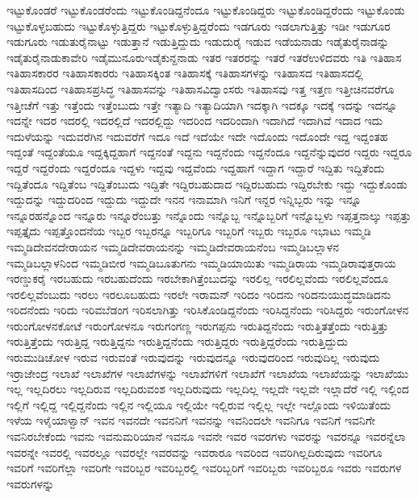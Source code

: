 {ಇಟ್ಟುಕೊಂಡರೆ
ಇಟ್ಟುಕೊಂಡರೆಂದು
ಇಟ್ಟುಕೊಂಡಿದ್ದನೆಂದೂ
ಇಟ್ಟುಕೊಂಡಿದ್ದರು
ಇಟ್ಟುಕೊಂಡಿದ್ದರೆಂದು
ಇಟ್ಟುಕೊಂಡು
ಇಟ್ಟುಕೊಳ್ಳಬಹುದು
ಇಟ್ಟುಕೊಳ್ಳುತ್ತಿದ್ದರು
ಇಟ್ಟುಕೊಳ್ಳುತ್ತಿದ್ದರೆಂದು
ಇಡಗೂರು
ಇಡಲಾಗುತ್ತಿತ್ತು
ಇಡೀ
ಇಡುಗೂರ
ಇಡುಗೂರು
ಇಡುತುರೈನಾಟ್ಟು
ಇಡುತ್ತಾನೆ
ಇಡುತ್ತಿದ್ದುದು
ಇಡುದುರೈ
ಇಡುವ
ಇಡೆಯನಾಡು
ಇಡೈತುರೈನಾಡನ್ನು
ಇಡೈತುರೈನಾಡುಕಾವೇರಿ
ಇಡೈಮುನೂರುಇಡೈಕುನ್ದನಾಡು
ಇತರ
ಇತರರನ್ನು
ಇತರೆ
ಇತರೆಉಳಿದವರು
ಇತಿ
ಇತಿಹಾಸ
ಇತಿಹಾಸಕಾರರ
ಇತಿಹಾಸಕಾರರು
ಇತಿಹಾಸಕ್ಕಿಂತ
ಇತಿಹಾಸಕ್ಕೆ
ಇತಿಹಾಸಗಳನ್ನು
ಇತಿಹಾಸದ
ಇತಿಹಾಸದಲ್ಲಿ
ಇತಿಹಾಸದಿಂದ
ಇತಿಹಾಸಪ್ರಸಿದ್ಧ
ಇತಿಹಾಸವನ್ನು
ಇತಿಹಾಸವಿದ್ವಾಂಸರು
ಇತಿಹಾಸವು
ಇತ್ತ
ಇತ್ತಣ
ಇತ್ತೀಚಿನವರೆಗೂ
ಇತ್ತೀಚೆಗೆ
ಇತ್ತು
ಇತ್ತೆಂದು
ಇತ್ತೆಂಬುದು
ಇತ್ತೇ
ಇತ್ಯಾದಿ
ಇತ್ಯಾದಿಯಾಗಿ
ಇದಕ್ಕಾಗಿ
ಇದಕ್ಕೂ
ಇದಕ್ಕೆ
ಇದನ್ನು
ಇದನ್ನೂ
ಇದನ್ನೇ
ಇದರ
ಇದರಲ್ಲಿ
ಇದರಲ್ಲಿದೆ
ಇದರಲ್ಲಿದ್ದು
ಇದರಿಂದ
ಇದರಿಂದಾಗಿ
ಇದಾಗಿದೆ
ಇದಾಗಿವೆ
ಇದಾದ
ಇದು
ಇದುಳೆಯನ್ನು
ಇದುವರೆಗಿನ
ಇದುವರೆಗೆ
ಇದೂ
ಇದೆ
ಇದೆಯೇ
ಇದೇ
ಇದೊಂದು
ಇದೊಂದೇ
ಇದ್ದ
ಇದ್ದಂತಹ
ಇದ್ದಂತೆ
ಇದ್ದಂತೆಯೂ
ಇದ್ದಕ್ಕಿದ್ದಹಾಗೆ
ಇದ್ದನಂತೆ
ಇದ್ದನು
ಇದ್ದನೆಂದು
ಇದ್ದನೆಂದೂ
ಇದ್ದನೆನ್ನುವುದರ
ಇದ್ದರು
ಇದ್ದರೂ
ಇದ್ದರೆ
ಇದ್ದರೆಂದು
ಇದ್ದರೆಂದೂ
ಇದ್ದಳು
ಇದ್ದವು
ಇದ್ದವೆಂದು
ಇದ್ದಹಾಗೆ
ಇದ್ದಾಗ
ಇದ್ದಾರೆ
ಇದ್ದಿತು
ಇದ್ದಿತೆಂದು
ಇದ್ದಿತೆಂದೂ
ಇದ್ದಿತೆಂಬ
ಇದ್ದಿತೆಂಬುದು
ಇದ್ದಿತೇ
ಇದ್ದಿರಬಹುದಾದ
ಇದ್ದಿರಬಹುದು
ಇದ್ದಿರಬೇಕು
ಇದ್ದು
ಇದ್ದುಕೊಂಡು
ಇದ್ದುದನ್ನು
ಇದ್ದುದರಿಂದ
ಇದ್ದುದು
ಇದ್ದುದೇ
ಇನನ
ಇನಾಮಾಗಿ
ಇನಿಗೆ
ಇನ್ದರ
ಇನ್ನಿಬ್ಬರು
ಇನ್ನು
ಇನ್ನೂ
ಇನ್ನೂರಹನ್ನೊಂದ
ಇನ್ನೂರು
ಇನ್ನೂರೆಂಬತ್ತು
ಇನ್ನೊಂದು
ಇನ್ನೊಬ್ಬ
ಇನ್ನೊಬ್ಬರಿಗೆ
ಇನ್ನೊಬ್ಬಳು
ಇಪ್ಪತ್ತನಾಲ್ಕು
ಇಪ್ಪತ್ತು
ಇಪ್ಪತ್ತೈದು
ಇಪ್ಪತ್ತೊಂದನೆಯ
ಇಬ್ಬರ
ಇಬ್ಬರನ್ನೂ
ಇಬ್ಬರಿಗೂ
ಇಬ್ಬರಿಗೆ
ಇಬ್ಬರು
ಇಬ್ಬರೂ
ಇಭಾಟು
ಇಮ್ಮಡಿ
ಇಮ್ಮಡಿದೇವನದೇರಾಯನ
ಇಮ್ಮಡಿದೇವರಾಯನನ್ನು
ಇಮ್ಮಡಿದೇವರಾಯನೆಂಬ
ಇಮ್ಮಡಿಬಲ್ಲಾಳನ
ಇಮ್ಮಡಿಬಲ್ಲಾಳನಿಂದ
ಇಮ್ಮಡಿಬೀರ
ಇಮ್ಮಡಿಬೂತುಗನು
ಇಮ್ಮಡಿಯಾಯಿತು
ಇಮ್ಮಡಿರಾಯ
ಇಮ್ಮಡಿರಾವುತ್ತರಾಯ
ಇರಣ್ಡುಕರೈ
ಇರಬಹುದು
ಇರಬಹುದೆಂದು
ಇರಬೇಕಾಗಿತ್ತೆಂಬುದನ್ನು
ಇರಲಿಲ್ಲ
ಇರಲಿಲ್ಲವೆಂದು
ಇರಲಿಲ್ಲವೆಂದೂ
ಇರಲಿಲ್ಲವೆಂಬುದು
ಇರಲು
ಇರಲೂಬಹುದು
ಇರಲೇ
ಇರಾಮನ್
ಇರಿದಂ
ಇರಿದನು
ಇರಿದನುಯುದ್ಧಮಾಡಿದನು
ಇರಿದನೆಂದು
ಇರಿದು
ಇರಿವಬೆಡಂಗ
ಇರಿಸಲಾಗಿತ್ತು
ಇರಿಸಿಕೊಂಡಿದ್ದನೆಂದು
ಇರಿಸಿದ್ದನೆಂದು
ಇರಿಸಿದ್ದರು
ಇರುಂಗೋಳನ
ಇರುಂಗೋಳನಕೋಟೆ
ಇರುಂಗೋಳನೂ
ಇರುಗಂಗಣ್ಣ
ಇರುಗಪ್ಪನು
ಇರುತಿದ್ದನೆಂದು
ಇರುತ್ತಿತತ್ತೆಂದು
ಇರುತ್ತಿತ್ತು
ಇರುತ್ತಿತ್ತೆಂದು
ಇರುತ್ತಿದ್ದ
ಇರುತ್ತಿದ್ದನು
ಇರುತ್ತಿದ್ದನೆಂದು
ಇರುತ್ತಿದ್ದರು
ಇರುತ್ತಿದ್ದರೆಂದು
ಇರುತ್ತಿದ್ದುದು
ಇರುಮುಡಿಚೋಳ
ಇರುವ
ಇರುವಂತೆ
ಇರುವುದನ್ನು
ಇರುವುದನ್ನೂ
ಇರುವುದರಿಂದ
ಇರುವುದಿಲ್ಲ
ಇರುವುದು
ಇರ್ರಾಜೇಂದ್ರ
ಇಲಾಖೆ
ಇಲಾಖೆಗಳ
ಇಲಾಖೆಗಳನ್ನು
ಇಲಾಖೆಗಳಿಗೆ
ಇಲಾಖೆಗೆ
ಇಲಾಖೆಯ
ಇಲಾಖೆಯನ್ನು
ಇಲಾಖೆಯು
ಇಲ್ಲ
ಇಲ್ಲದಿರಲು
ಇಲ್ಲದಿರುವ
ಇಲ್ಲದಿರುವಂಶ
ಇಲ್ಲದಿರುವುದು
ಇಲ್ಲದಿಲ್ಲ
ಇಲ್ಲದೇ
ಇಲ್ಲವೇ
ಇಲ್ಲಾದೆರೆ
ಇಲ್ಲಿ
ಇಲ್ಲಿಂದ
ಇಲ್ಲಿಗೆ
ಇಲ್ಲಿದ್ದ
ಇಲ್ಲಿದ್ದನೆಂದು
ಇಲ್ಲಿನ
ಇಲ್ಲಿಯೂ
ಇಲ್ಲಿಯೇ
ಇಲ್ಲಿರುವ
ಇಲ್ಲಿಲ್ಲ
ಇಲ್ಲೇ
ಇಲ್ಲೊಂದು
ಇಳಿಯಿತೆಂದು
ಇಳೆಯ
ಇಳೈಯಾಳ್ವಾನ್
ಇವನ
ಇವನದೇ
ಇವನನಿಗೆ
ಇವನನ್ನು
ಇವನಿಂದಲೇ
ಇವನಿಗೂ
ಇವನಿಗೆ
ಇವನಿಗೇ
ಇವನಿರಬೇಕೆಂದು
ಇವನು
ಇವನುಮರಿಯಾನೆ
ಇವನೂ
ಇವನೇ
ಇವರ
ಇವರಗಳು
ಇವರನ್ನು
ಇವರನ್ನೂ
ಇವರನ್ನೆಲಾ
ಇವರನ್ನೇ
ಇವರಲ್ಲಿ
ಇವರಲ್ಲೂ
ಇವರಲ್ಲೇ
ಇವರವನ್ನು
ಇವರಾರೂ
ಇವರಿಂದ
ಇವರಿಗಿಲ್ಲದಿರುವುದು
ಇವರಿಗೂ
ಇವರಿಗೆ
ಇವರಿಗೆಲ್ಲಾ
ಇವರಿಗೇ
ಇವರಿಬ್ಬರ
ಇವರಿಬ್ಬರಲ್ಲಿ
ಇವರಿಬ್ಬರಿಗೆ
ಇವರಿಬ್ಬರು
ಇವರಿಬ್ಬರೂ
ಇವರು
ಇವರುಗಳ
ಇವರುಗಳನ್ನು
}
